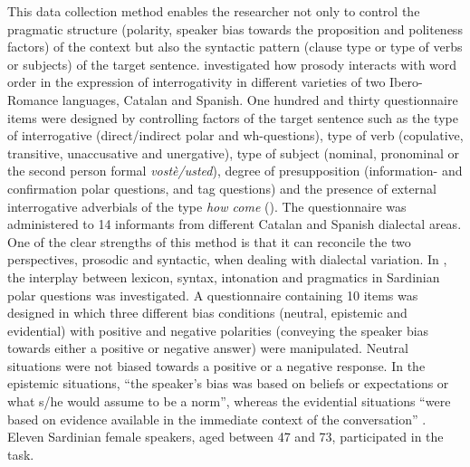 \documentclass[output=paper]{LSP/langsci}
\begin{document}
This data collection method enables the researcher not only to control the pragmatic structure (polarity, speaker bias towards the proposition and politeness factors) of the context but also the syntactic pattern (clause type or type of verbs or subjects) of the target sentence. \citet{Vanrell2014dialectinterrogatives} investigated how prosody interacts with word order in the expression of interrogativity in different varieties of two Ibero-Romance languages, Catalan and Spanish. One hundred and thirty questionnaire items were designed by controlling factors of the target sentence such as the type of interrogative (direct/indirect polar and wh-questions), type of verb (copulative, transitive, unaccusative and unergative), type of subject (nominal, pronominal or the second person formal \textit{vostè/usted}), degree of presupposition (information- and confirmation polar questions, and tag questions) and the presence of external interrogative adverbials of the type \textit{how come} (\citealt{Rizzi2001}). The questionnaire was administered to 14 informants from different Catalan and Spanish dialectal areas. One of the clear strengths of this method is that it can reconcile the two perspectives, prosodic and syntactic, when dealing with dialectal variation. In \citet{Vanrell2014sardinianpolar}, the interplay between lexicon, syntax, intonation and pragmatics in Sardinian polar questions was investigated. A questionnaire containing 10 items was designed in which three different bias conditions (neutral, epistemic and evidential) with positive and negative polarities (conveying the speaker bias towards either a positive or negative answer) were manipulated. Neutral situations were not biased towards a positive or a negative response. In the epistemic situations, “the speaker’s bias was based on beliefs or expectations or what s/he would assume to be a norm”, whereas the evidential situations “were based on evidence available in the immediate context of the conversation” \citep[4]{Vanrell2014sardinianpolar}. Eleven Sardinian female speakers, aged between 47 and 73, participated in the task. 
\end{document}
